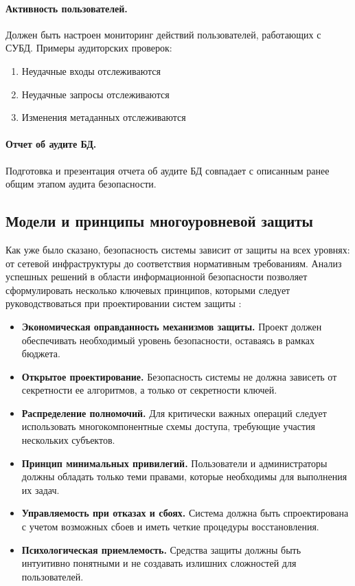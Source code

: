 \paragraph{Активность пользователей.}

Должен быть настроен мониторинг действий пользователей, работающих с СУБД. Примеры аудиторских проверок:

\begin{enumerate}
	\item Неудачные входы отслеживаются
	\item Неудачные запросы отслеживаются
	\item Изменения метаданных отслеживаются
\end{enumerate}

\paragraph{Отчет об аудите БД.}

Подготовка и презентация отчета об аудите БД совпадает с описанным ранее общим этапом аудита безопасности.

\clearpage

\subsection{Модели и принципы многоуровневой защиты}
Как уже было сказано, безопасность системы зависит от защиты на всех уровнях: от сетевой инфраструктуры до соответствия нормативным требованиям. Анализ успешных решений в области информационной безопасности позволяет сформулировать несколько ключевых принципов, которыми следует руководствоваться при проектировании систем защиты \autocite{Smirnov2007}:
\begin{itemize}
	\item \textbf{Экономическая оправданность механизмов защиты.} Проект должен обеспечивать необходимый уровень безопасности, оставаясь в рамках бюджета.
	\item \textbf{Открытое проектирование.} Безопасность системы не должна зависеть от секретности ее алгоритмов, а только от секретности ключей.
	\item \textbf{Распределение полномочий.} Для критически важных операций следует использовать многокомпонентные схемы доступа, требующие участия нескольких субъектов.
	\item \textbf{Принцип минимальных привилегий.} Пользователи и администраторы должны обладать только теми правами, которые необходимы для выполнения их задач.
	\item \textbf{Управляемость при отказах и сбоях.} Система должна быть спроектирована с учетом возможных сбоев и иметь четкие процедуры восстановления.
	\item \textbf{Психологическая приемлемость.} Средства защиты должны быть интуитивно понятными и не создавать излишних сложностей для пользователей.
\end{itemize}

